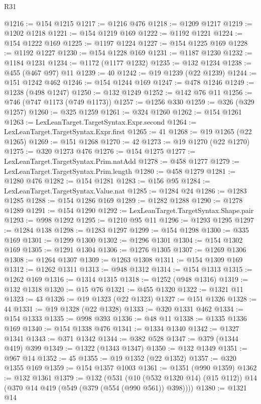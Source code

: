 \begin{lexlean}{R31}
\begin{coremodule}
@1216 := @154 @1215
@1217 := @1216 @476
@1218 := @1209 @1217
@1219 := @1202 @1218
@1221 := @154 @1219 @169
@1222 := @1192 @1221
@1224 := @154 @1222 @169
@1225 := @1197 @1224
@1227 := @154 @1225 @169
@1228 := @1192 @1227
@1230 := @154 @1228 @169
@1231 := @1187 @1230
@1232 := @1184 @1231
@1234 := @1172 (@1177 @1232)
@1235 := @132 @1234
@1238 := @455 (@467 @97) @11
@1239 := 40
@1242 := @19 @1239 (@22 @1239)
@1244 := @151 @1242 @462
@1246 := @154 @1244 @169
@1247 := @478 @1246
@1249 := @1238 (@498 @1247)
@1250 := @132 @1249
@1252 := @142 @76 @11
@1256 := @746 (@747 @1173 (@749 @1173))
@1257 := @1256 @330
@1259 := @326 (@329 @1257)
@1260 := @325 @1259
@1261 := @324 @1260
@1262 := @154 @1261
@1263 := LexLeanTarget.TargetSyntax.Expr.second
@1264 := LexLeanTarget.TargetSyntax.Expr.first
@1265 := 41
@1268 := @19 @1265 (@22 @1265)
@1269 := @151 @1268
@1270 := 42
@1273 := @19 @1270 (@22 @1270)
@1275 := @320 @1273 @476
@1276 := @154 @1275
@1277 := LexLeanTarget.TargetSyntax.Prim.natAdd
@1278 := @458 @1277
@1279 := LexLeanTarget.TargetSyntax.Prim.length
@1280 := @458 @1279
@1281 := @1280 @476
@1282 := @154 @1281
@1283 := @156 @95
@1284 := LexLeanTarget.TargetSyntax.Value.nat
@1285 := @1284 @24
@1286 := @1283 @1285
@1288 := @154 @1286 @169
@1289 := @1282 @1288
@1290 := @1278 @1289
@1291 := @154 @1290
@1292 := LexLeanTarget.TargetSyntax.Shape.pair
@1293 := @998 @1292
@1295 := @1210 @95 @11
@1296 := @1293 @1295
@1297 := @1284 @138
@1298 := @1283 @1297
@1299 := @154 @1298
@1300 := @335 @169
@1301 := @1299 @1300
@1302 := @1296 @1301
@1304 := @154 @1302 @169
@1305 := @1291 @1304
@1306 := @1276 @1305
@1307 := @1269 @1306
@1308 := @1264 @1307
@1309 := @1263 @1308
@1311 := @154 @1309 @169
@1312 := @1262 @1311
@1313 := @948 @1312
@1314 := @154 @1313
@1315 := @1262 @169
@1316 := @1314 @1315
@1318 := @1252 (@948 @1316)
@1319 := @132 @1318
@1320 := @15 @76
@1321 := @455 @1320
@1322 := @1321 @11
@1323 := 43
@1326 := @19 @1323 (@22 @1323)
@1327 := @151 @1326
@1328 := 44
@1331 := @19 @1328 (@22 @1328)
@1333 := @320 @1331 @462
@1334 := @154 @1333
@1335 := @998 @393
@1336 := @48 @11
@1338 := @1335 @1336 @169
@1340 := @154 @1338 @476
@1341 := @1334 @1340
@1342 := @1327 @1341
@1343 := @371 @1342
@1344 := @382 @528
@1347 := @379 (@1344 @419) @399
@1349 := @1322 (@1343 @1347)
@1350 := @132 @1349
@1351 := @967 @14
@1352 := 45
@1355 := @19 @1352 (@22 @1352)
@1357 := @320 @1355 @169
@1359 := @154 @1357 @1003
@1361 := @1351 (@990 @1359)
@1362 := @132 @1361
@1379 := @132
    (@531
      (@10 (@532 @1320 @14) (@15 @112))
      @14
      (@370 @14 @419 (@549 (@379 (@554 (@990 @561)) @398))))
@1380 := @1321 @14

\end{coremodule}
\end{lexlean}
